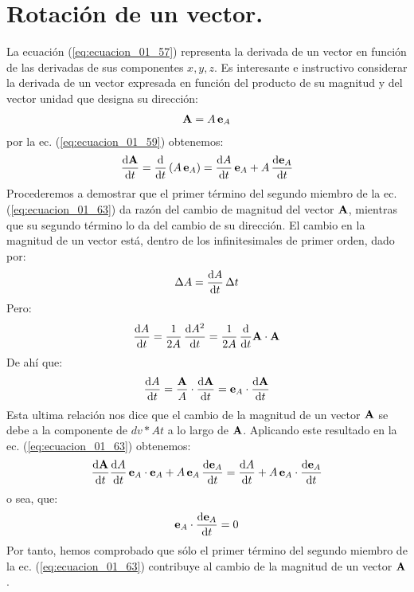 \section{Rotación de un vector.} \label{sec:rotacion_vector}

La ecuación (\ref{eq:ecuacion_01_57}) representa la derivada de un vector en función de las derivadas de sus componentes $x, y, z$. Es interesante e instructivo considerar la derivada de un vector expresada en función del producto de su magnitud y del vector unidad que designa su dirección:
\begin{align*}
    \vb{A} = A \, \vb{e}_{A}
\end{align*}
por la ec. (\ref{eq:ecuacion_01_59}) obtenemos:
\begin{align}
    \dv{\vb{A}}{t} = \dv{t} \left( A \, \vb{e}_{A} \right) = \dv{A}{t} \, \vb{e}_{A} + A \, \dv{\vb{e}_{A}}{t}
    \label{eq:ecuacion_01_63}
\end{align}
Procederemos a demostrar que el primer término del segundo miembro de la ec. (\ref{eq:ecuacion_01_63}) da razón del cambio de magnitud del vector $\vb{A}$, mientras que su segundo término lo da del cambio de su dirección. El cambio en la magnitud de un vector está, dentro de los infinitesimales de primer orden, dado por:
\begin{align*}
    \Delta A = \dv{A}{t} \, \Delta t
\end{align*}
Pero:
\begin{align*}
    \dv{A}{t} =\dfrac{1}{2 A} \, \dv{A^{2}}{t} = \dfrac{1}{2 A} \, \dv{t} \vb{A} \cdot \vb{A} 
\end{align*}
De ahí que:
\begin{align}
    \dv{A}{t} = \dfrac{\vb{A}}{A} \cdot \dv{\vb{A}}{t} = \vb{e}_{A} \cdot \dv{\vb{A}}{t}
    \label{eq:ecuacion_01_64}
\end{align}
Esta ultima relación nos dice que el cambio de la magnitud de un vector $\vb{A}$ se debe a la componente de $dv*{A}{t}$ a lo largo de $\vb{A}$. Aplicando este resultado en la ec. (\ref{eq:ecuacion_01_63}) obtenemos:
\begin{align}
    \dv{\vb{A}}{t} \dv{A}{t} \, \vb{e}_{A} \cdot \vb{e}_{A} + A \, \vb{e}_{A} \, \dv{\vb{e}_{A}}{t} = \dv{A}{t} + A \, \vb{e}_{A} \cdot \dv{\vb{e}_{A}}{t}
    \label{eq:ecuacion_01_65}
\end{align}
o sea, que:
\begin{align}
    \vb{e}_{A} \cdot \dv{\vb{e}_{A}}{t} = 0
    \label{eq:ecuacion_01_66}
\end{align}
Por tanto, hemos comprobado que sólo el primer término del segundo miembro de la ec. (\ref{eq:ecuacion_01_63}) contribuye al cambio de la magnitud de un vector $\vb{A}$. 
